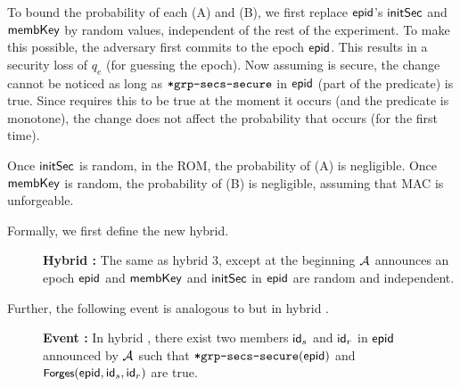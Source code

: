 To bound the probability of each (A) and (B), we first replace ${\normalfont\textsf{epid}}$'s ${\mathsf{initSec}}$ and ${\mathsf{membKey}}$ by random values, independent of the rest of the experiment. To make this possible, the adversary first commits to the epoch ${\normalfont\textsf{epid}}$. This results in a security loss of $q_e$ (for guessing the epoch).
Now assuming \mmPKE is secure, the change cannot be noticed as long as ${\textnormal{\tt*grp-secs-secure}}$ in ${\normalfont\textsf{epid}}$ (part of the \KwConf{} predicate) is true. Since \forgess requires this to be true at the moment it occurs (and the predicate is monotone), the change does not affect the probability that \forgess occurs (for the first time).

Once ${\mathsf{initSec}}$ is random, in the ROM, the probability of (A) is negligible. Once ${\mathsf{membKey}}$ is random, the probability of (B) is negligible, assuming that MAC is unforgeable.

Formally, we first define the new hybrid.
\begin{description}
  \item[] {\bf Hybrid \hybridThreeN : } The same as hybrid 3, except at the beginning $\mathcal{A}_{\relax}$ announces an epoch ${\normalfont\textsf{epid}}$ and ${\mathsf{membKey}}$ and ${\mathsf{initSec}}$ in ${\normalfont\textsf{epid}}$ are random and independent.
\end{description}

Further, the following event is analogous to \forgess but in hybrid \hybridThreeN.
\begin{description}
  \item[] {\bf Event \forgessN : } In hybrid \hybridThreeN, there exist two members ${\mathsf{id}}_s$ and ${\mathsf{id}}_r$ in ${\normalfont\textsf{epid}}$ announced by $\mathcal{A}_{\relax}$ such that ${\textnormal{\tt*grp-secs-secure}}({\normalfont\textsf{epid}})$ and $\textnormal{\textsf{\small Forges}}({\normalfont\textsf{epid}}, {\mathsf{id}}_s, {\mathsf{id}}_r)$ are true.
\end{description}

